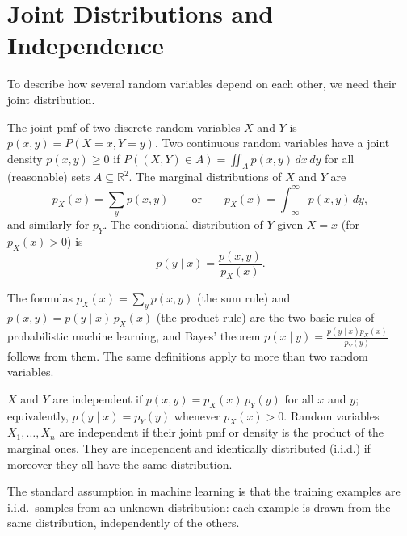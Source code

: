 \section{Joint Distributions and Independence}\label{L4-sec:joint}

To describe how several random variables depend on each other, we need their joint distribution.

\begin{definition}\label{L4-def:joint}
    The joint pmf of two discrete random variables $X$ and $Y$ is $p(x, y) = P(X = x, Y = y)$. Two continuous random variables have a joint density $p(x, y) \geq 0$ if $P((X, Y) \in A) = \iint_A p(x, y) \, dx \, dy$ for all (reasonable) sets $A \subseteq \mathbb{R}^2$. The marginal distributions of $X$ and $Y$ are
    \[p_X(x) = \sum_y p(x, y) \qquad \text{or} \qquad p_X(x) = \int_{-\infty}^\infty p(x, y) \, dy,\]
    and similarly for $p_Y$. The conditional distribution of $Y$ given $X = x$ (for $p_X(x) > 0$) is
    \[p(y \mid x) = \frac{p(x, y)}{p_X(x)}.\]
\end{definition}

The formulas $p_X(x) = \sum_y p(x, y)$ (the sum rule) and $p(x, y) = p(y \mid x)\,p_X(x)$ (the product rule) are the two basic rules of probabilistic machine learning, and Bayes' theorem $p(x \mid y) = \frac{p(y \mid x)p_X(x)}{p_Y(y)}$ follows from them. The same definitions apply to more than two random variables.

\begin{definition}\label{L4-def:independent-rv}
    $X$ and $Y$ are independent if $p(x, y) = p_X(x)\,p_Y(y)$ for all $x$ and $y$; equivalently, $p(y \mid x) = p_Y(y)$ whenever $p_X(x) > 0$. Random variables $X_1, \ldots, X_n$ are independent if their joint pmf or density is the product of the marginal ones. They are independent and identically distributed (i.i.d.) if moreover they all have the same distribution.
\end{definition}

The standard assumption in machine learning is that the training examples are i.i.d.\ samples from an unknown distribution: each example is drawn from the same distribution, independently of the others.

